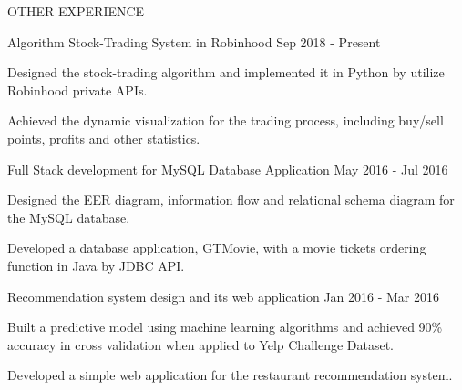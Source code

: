 \documentclass{resume} %
\begin{document}
\begin{rSection}{OTHER EXPERIENCE}

	\begin{rSubsection}{Algorithm Stock-Trading System in Robinhood}{ Sep 2018 - Present}{}{}
		\setlength{\parindent}{2em}
                 \item Designed the stock-trading algorithm and implemented it in Python by utilize Robinhood private APIs.
                 \item Achieved the dynamic visualization for the trading process, including buy/sell points, profits and other statistics.
	\end{rSubsection}	

	\begin{rSubsection}{Full Stack development for MySQL Database Application}{ May 2016 - Jul 2016}{}{}
		\setlength{\parindent}{2em}
                 \item Designed the EER diagram, information flow and relational schema diagram for the MySQL database.
                 \item Developed a database application, GTMovie,  with a movie tickets ordering function in Java by JDBC API.
	\end{rSubsection}	
	
	
	\begin{rSubsection}{Recommendation system design and its web application} {Jan 2016 - Mar 2016}{}{}

                 \item Built a predictive model using machine learning algorithms and achieved 90\% accuracy in cross validation when applied to Yelp  Challenge Dataset.
                 \item Developed a simple web application for the restaurant recommendation system.
	\end{rSubsection}	


\end{rSection}
\end{document}
